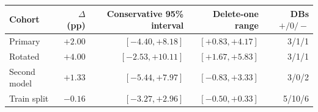 \begin{tabular}{@{}lrrrr@{}}
\toprule
Cohort & $\Delta$ (pp) & Conservative 95\% interval & Delete-one range & DBs $+/0/-$ \\
\midrule
Primary & $+2.00$ & $[-4.40, +8.18]$ & $[+0.83, +4.17]$ & 3/1/1 \\
Rotated & $+4.00$ & $[-2.53, +10.11]$ & $[+1.67, +5.83]$ & 3/1/1 \\
Second model & $+1.33$ & $[-5.44, +7.97]$ & $[-0.83, +3.33]$ & 3/0/2 \\
Train split & $-0.16$ & $[-3.27, +2.96]$ & $[-0.50, +0.33]$ & 5/10/6 \\
\bottomrule
\end{tabular}
